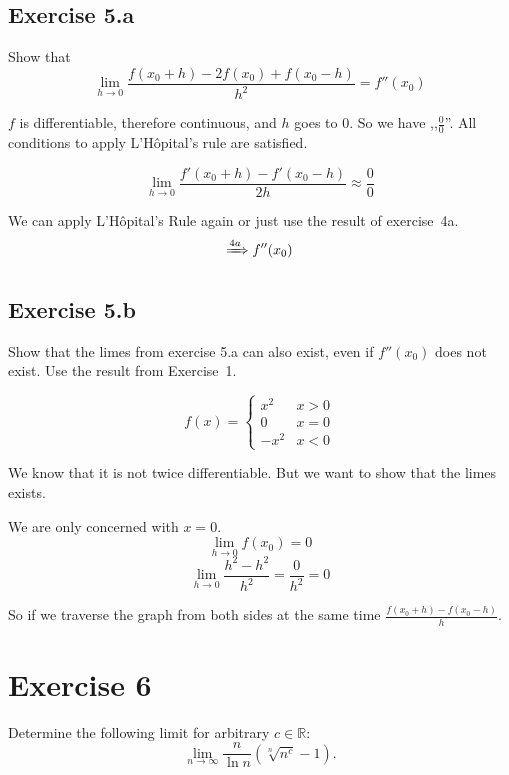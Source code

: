 \documentclass[a4paper]{article}
\theoremstyle{definition}
\begin{document}
\subsection{Exercise 5.a}
\begin{ex}
  Show that
  \[ \lim_{h\to0} \frac{f(x_0 + h) - 2f(x_0) + f(x_0 - h)}{h^2} = f''(x_0) \]
\end{ex}

$f$ is differentiable, therefore continuous, and $h$ goes to $0$. So we have ,,$\frac00$''.
All conditions to apply L'H\^opital's rule are satisfied.

\[ \lim_{h\to0} \frac{f'(x_0 + h) - f'(x_0 - h)}{2h} \approx \frac00 \]

We can apply L'H\^opital's Rule again or just use the result of exercise~4a.
\[ \xRightarrow{4a} f''(x_0) \]

\subsection{Exercise 5.b}
%
\begin{ex}
  Show that the limes from exercise 5.a can also exist, even if $f''(x_0)$ does not exist.
  Use the result from Exercise~1.
\end{ex}
\[ f(x) = \begin{cases} x^2 & x > 0 \\ 0 & x = 0 \\ -x^2 & x < 0 \end{cases} \]


We know that it is not twice differentiable. But we want to show that the limes exists.

We are only concerned with $x=0$.
\[ \lim_{h\to0} f(x_0) = 0 \]
\[
  \lim_{h\to0} \frac{h^2 - h^2}{h^2} = \frac{0}{h^2} = 0
\]

So if we traverse the graph from both sides at the same time $\frac{f(x_0 + h) - f(x_0 - h)}{h}$.

\section{Exercise 6}
\begin{ex}
  Determine the following limit for arbitrary $c \in \mathbb R$:
  \[ \lim_{n\to\infty} \frac{n}{\ln{n}} \left(\sqrt[n]{n^c} - 1\right). \]
\end{ex}
\end{document}
